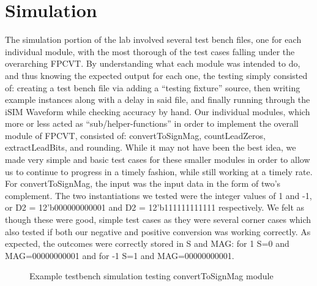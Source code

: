 \documentclass{article}
\begin{document}

\section*{Simulation}


The simulation portion of the lab involved several test bench files, one for each individual module, with the most thorough of the test cases falling under the overarching FPCVT.  By understanding what each module was intended to do, and thus knowing the expected output for each one, the testing simply consisted of: creating a test bench file via adding a ``testing fixture'' source, then writing example instances along with a delay in said file, and finally running through the iSIM Waveform while checking accuracy by hand. Our individual modules, which more or less acted as ``sub/helper-functions'' in order to implement the overall module of FPCVT, consisted of: convertToSignMag, countLeadZeros, extractLeadBits, and rounding.  While it may not have been the best idea, we made very simple and basic test cases for these smaller modules in order to allow us to continue to progress in a timely fashion, while still working at a timely rate.  \\ 

For convertToSignMag, the input was the input data in the form of two's complement.  The two instantiations we tested were the integer values of 1 and -1, or D2 = 12'b000000000001 and D2 = 12'b111111111111 respectively.  We felt as though these were good, simple test cases as they were several corner cases which also tested if both our negative and positive conversion was working correctly.  As expected, the outcomes were correctly stored in S and MAG: for 1 S=0 and MAG=00000000001 and for -1 S=1 and MAG=00000000001.     

\begin{figure}[H]
	\begin{center}
		\caption{Example testbench simulation testing convertToSignMag module}
	\end{center}
\end{figure}
\end{document}
